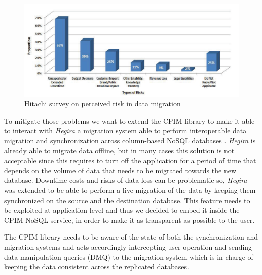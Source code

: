 \begin{figure}[tbh]
  \centering
  \includegraphics[width=13cm]{images/hitachi_survey}
  \caption{Hitachi survey on perceived risk in data migration \cite{paper:hitachi} }
  \label{fig:cpim-nosql}
\end{figure}

\newparagraph To mitigate those problems we want to extend the CPIM library to make it able to interact with \textit{Hegira} a migration system able to perform interoperable data migration and synchronization across column-based NoSQL databases \cite{paper:modaclouds-deliverable}. \textit{Hegira} is already able to migrate data offline, but in many cases this solution is not acceptable since this requires to turn off the application for a period of time that depends on the volume of data that needs to be migrated towards the new database. 
Downtime costs and risks of data loss can be problematic so, \textit{Hegira} was extended to be able to perform a live-migration of the data by keeping them synchronized on the source and the destination database.
This feature needs to be exploited at application level and thus we decided to embed it inside the CPIM NoSQL service, in order to make it as transparent as possible to the user.

\noindent The CPIM library needs to be aware of the state of both the synchronization and migration systems and acts accordingly intercepting user operation and sending data manipulation queries (DMQ) to the migration system which is in charge of keeping the data consistent across the replicated databases.